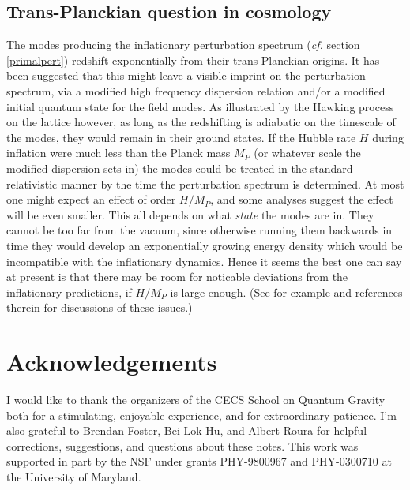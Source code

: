 \documentclass[12pt]{article}
\begin{document}
\subsection{Trans-Planckian question in cosmology}
The modes producing the
inflationary perturbation spectrum
({\it cf.} section  \ref{primalpert}) redshift exponentially
from their trans-Planckian
origins. It has been suggested that this might leave 
a visible imprint on the perturbation spectrum, via a
modified high frequency dispersion relation and/or
a modified initial quantum state for the field modes.
As illustrated
by the Hawking process on the lattice 
however, as long as the redshifting
is adiabatic on the timescale of the modes, they would
remain in their ground states.
If the Hubble rate $H$ during inflation were much
less than the Planck mass $M_P$ (or whatever scale the
modified dispersion sets in)
the modes could be treated
in the standard relativistic manner by the
time the perturbation spectrum is determined. 
At most one might expect an
effect of order $H/M_P$, and 
some analyses suggest the effect will be even smaller. 
This all depends on what {\it state} the modes are in.
They cannot be too far from the vacuum, since otherwise 
running them backwards in time they would develop
an exponentially growing 
energy density which would be incompatible with the
inflationary dynamics. Hence it seems the best one can say 
at present is that there may be room for noticable deviations from the 
inflationary predictions, if $H/M_P$ is large enough.
(See for example \cite{TPC} and references therein
for discussions of these issues.)


\section*{Acknowledgements}
I would like to thank the organizers of the CECS 
School on Quantum Gravity both for a stimulating,
enjoyable experience, and for extraordinary patience. 
I'm also grateful to Brendan Foster, Bei-Lok Hu, and Albert Roura 
for helpful corrections, suggestions, and 
questions about these notes.
This work was supported in part by the NSF under grants
PHY-9800967 and PHY-0300710 at the University of Maryland.
\end{document}
